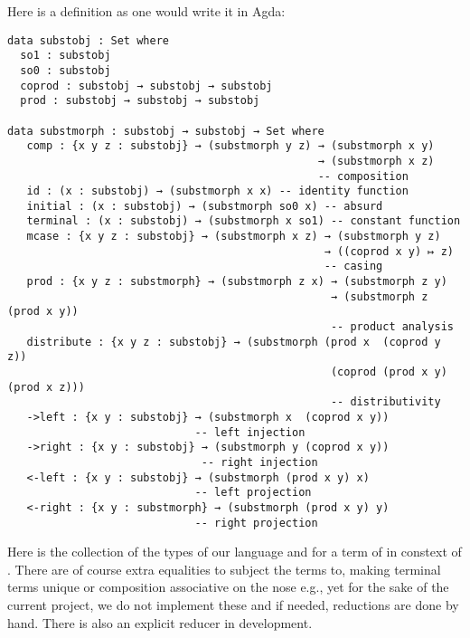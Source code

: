 
Here is a definition as one would write it in Agda:

\begin{verbatim}
data substobj : Set where
  so1 : substobj
  so0 : substobj
  coprod : substobj → substobj → substobj
  prod : substobj → substobj → substobj

data substmorph : substobj → substobj → Set where
   comp : {x y z : substobj} → (substmorph y z) → (substmorph x y) 
                                                → (substmorph x z) 
                                                -- composition
   id : (x : substobj) → (substmorph x x) -- identity function
   initial : (x : substobj) → (substmorph so0 x) -- absurd 
   terminal : (x : substobj) → (substmorph x so1) -- constant function
   mcase : {x y z : substobj} → (substmorph x z) → (substmorph y z) 
                                                 → ((coprod x y) ↦ z)
                                                 -- casing 
   prod : {x y z : substmorph} → (substmorph z x) → (substmorph z y) 
                                                  → (substmorph z (prod x y))
                                                  -- product analysis
   distribute : {x y z : substobj} → (substmorph (prod x  (coprod y z)) 
                                                  (coprod (prod x y) (prod x z)))
                                                  -- distributivity
   ->left : {x y : substobj} → (substmorph x  (coprod x y))
                             -- left injection
   ->right : {x y : substobj} → (substmorph y (coprod x y))
                              -- right injection
   <-left : {x y : substobj} → (substmorph (prod x y) x)
                             -- left projection
   <-right : {x y : substmorph} → (substmorph (prod x y) y) 
                             -- right projection
\end{verbatim}

Here \gebobj is the collection of the types of our language and  for a term of  in constext of . There are of course extra equalities to subject the terms to, making terminal terms unique or composition associative on the nose e.g., yet for the sake of the current project, we do not implement these and if needed, reductions are done by hand. There is also an explicit reducer in development.

